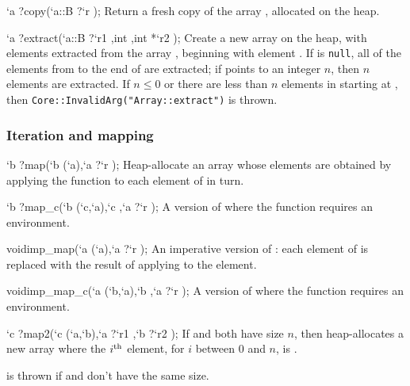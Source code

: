 \begin{defun2}{`a ?}{copy}{(`a::B {?}`r );}
  Return a fresh copy of the array , allocated on the heap.
\end{defun2}

\begin{defun2}{`a ?}{extract}{(`a::B {?}`r1 ,int ,int *`r2 );}
  Create a new array on the heap, with elements extracted from the
  array , beginning with element .  If
   is \texttt{null}, all of the elements from 
  to the end of  are extracted; if  points to an
  integer $n$, then $n$ elements are extracted.  If $n\leq 0$ or there
  are less than $n$ elements in  starting at ,
  then \texttt{Core::InvalidArg("Array::extract")} is thrown.
\end{defun2}

\subsubsection*{Iteration and mapping}

\begin{defun2}{`b ?}{map}{(`b (`a),`a {?}`r );}
  Heap-allocate an array whose elements are obtained by applying the
  function  to each element of  in turn.
\end{defun2}

\begin{defun2}{`b ?}{map_c}{(`b (`c,`a),`c ,`a {?}`r );}
  A version of  where the function  requires an
  environment.
\end{defun2}

\begin{defun2}{void}{imp_map}{(`a (`a),`a {?}`r );}
  An imperative version of : each element of  is
  replaced with the result of applying  to the element.
\end{defun2}

\begin{defun2}{void}{imp_map_c}{(`a (`b,`a),`b ,`a {?}`r );}
  A version of  where the function  requires an
  environment.
\end{defun2}

\begin{defun2}{`c ?}{map2}{(`c (`a,`b),`a {?}`r1 ,`b {?}`r2 );}
  If  and  both have size $n$, then 
  heap-allocates a new array where the $i^{\rm th}$ element, for $i$
  between 0 and $n$, is .
    
   is thrown if  and  don't have
  the same size.
\end{defun2}

